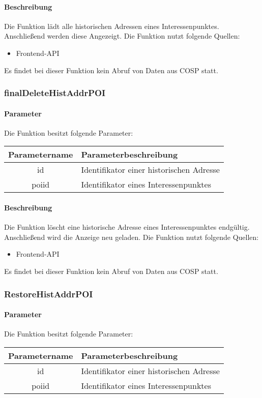 \paragraph{Beschreibung} Die Funktion lädt alle historischen Adressen eines Interessenpunktes. Anschließend werden diese Angezeigt. Die Funktion nutzt folgende Quellen:
\begin{itemize}
	\item Frontend-API
\end{itemize}
Es findet bei dieser Funktion kein Abruf von Daten aus {\glqq COSP\grqq} statt.
\subsubsection{finalDeleteHistAddrPOI}
\paragraph{Parameter} Die Funktion besitzt folgende Parameter:
\begin{table}[H]
	\begin{tabular}{|c|p{11cm}|}
		\hline
		\textbf{Parametername} & \textbf{Parameterbeschreibung} \\ \hline
		id    & Identifikator einer historischen Adresse \\ \hline
		poiid & Identifikator eines Interessenpunktes \\ \hline
	\end{tabular}
\end{table}
\paragraph{Beschreibung} Die Funktion löscht eine historische Adresse eines Interessenpunktes endgültig. Anschließend wird die Anzeige neu geladen. Die Funktion nutzt folgende Quellen:
\begin{itemize}
	\item Frontend-API
\end{itemize}
Es findet bei dieser Funktion kein Abruf von Daten aus {\glqq COSP\grqq} statt.
\subsubsection{RestoreHistAddrPOI}
\paragraph{Parameter} Die Funktion besitzt folgende Parameter:
\begin{table}[H]
	\begin{tabular}{|c|p{11cm}|}
		\hline
		\textbf{Parametername} & \textbf{Parameterbeschreibung} \\ \hline
		id    & Identifikator einer historischen Adresse \\ \hline
		poiid & Identifikator eines Interessenpunktes \\ \hline
	\end{tabular}
\end{table}
